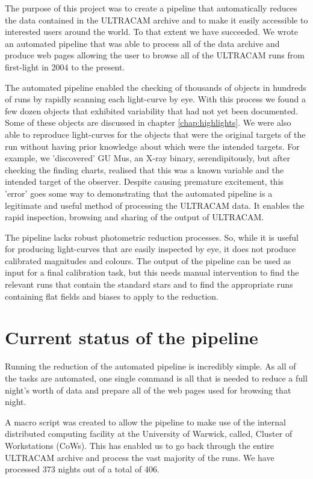 The purpose of this project was to create a pipeline that automatically reduces the data contained in the ULTRACAM archive and to make it easily accessible to interested users around the world. To that extent we have succeeded. We wrote an automated pipeline that was able to process all of the data archive and produce web pages allowing the user to browse all of the ULTRACAM runs from first-light in 2004 to the present. 

The automated pipeline enabled the checking of thousands of objects in hundreds of runs by rapidly scanning each light-curve by eye. With this process we found a few dozen objects that exhibited variability that had not yet been documented. Some of these objects are discussed in chapter \ref{chap:highlights}. We were also able to reproduce light-curves for the objects that were the original targets of the run without having prior knowledge about which were the intended targets. For example, we 'discovered' GU Mus, an X-ray binary, serendipitously, but after checking the finding charts, realised that this was a known variable and the intended target of the observer. Despite causing premature excitement, this 'error' goes some way to demonstrating that the automated pipeline is a legitimate and useful method of processing the ULTRACAM data. It enables the rapid inspection, browsing and sharing of the output of ULTRACAM. 

The pipeline lacks robust photometric reduction processes. So, while it is useful for producing light-curves that are easily inspected by eye, it does not produce calibrated magnitudes and colours. The output of the pipeline can be used as input for a final calibration task, but this needs manual intervention to find the relevant runs that contain the standard stars and to find the appropriate runs containing flat fields and biases to apply to the reduction. 

\section{Current status of the pipeline}
Running the reduction of the automated pipeline is incredibly simple. As all of the tasks are automated, one single command is all that is needed to reduce a full night's worth of data and prepare all of the web pages used for browsing that night. 

A macro script was created to allow the pipeline to make use of the internal distributed computing facility at the University of Warwick, called, Cluster of Workstations (CoWs). This has enabled us to go back through the entire ULTRACAM archive and process the vast majority of the runs. We have processed 373 nights out of a total of 406. 

